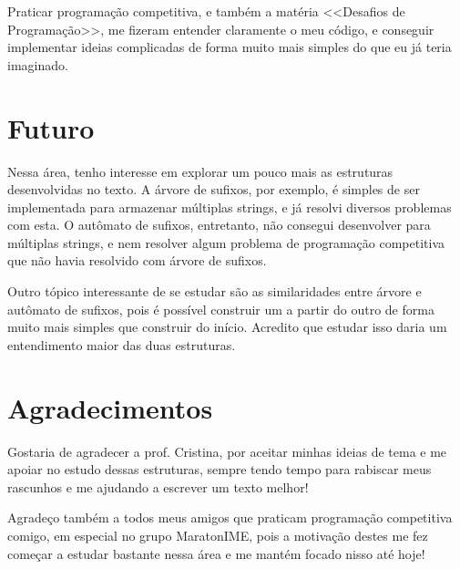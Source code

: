 Praticar programação competitiva, e também a matéria <<Desafios de Programação>>, me fizeram entender claramente o meu código, e conseguir implementar ideias complicadas de forma muito mais simples do que eu já teria imaginado.

\section{Futuro}

Nessa área, tenho interesse em explorar um pouco mais as estruturas desenvolvidas no texto. A árvore de sufixos, por exemplo, é simples de ser implementada para armazenar múltiplas strings, e já resolvi diversos problemas com esta. O autômato de sufixos, entretanto, não consegui desenvolver para múltiplas strings, e nem resolver algum problema de programação competitiva que não havia resolvido com árvore de sufixos.

Outro tópico interessante de se estudar são as similaridades entre árvore e autômato de sufixos, pois é possível construir um a partir do outro de forma muito mais simples que construir do início. Acredito que estudar isso daria um entendimento maior das duas estruturas.

\section{Agradecimentos}

Gostaria de agradecer a prof. Cristina, por aceitar minhas ideias de tema e me apoiar no estudo dessas estruturas, sempre tendo tempo para rabiscar meus rascunhos e me ajudando a escrever um texto melhor!

Agradeço também a todos meus amigos que praticam programação competitiva comigo, em especial no grupo MaratonIME, pois a motivação destes me fez começar a estudar bastante nessa área e me mantém focado nisso até hoje!